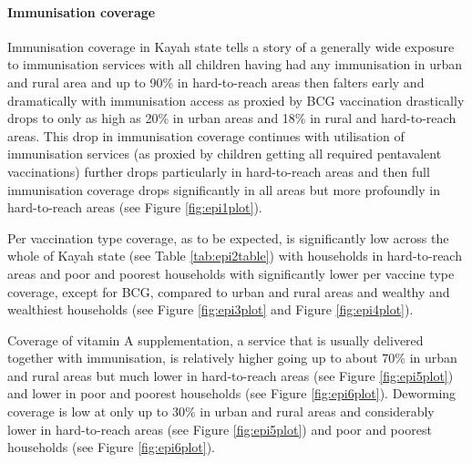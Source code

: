 \documentclass[12pt,a4paper]{article}
\let\oldparagraph\paragraph
\renewcommand{\paragraph}[1]{\oldparagraph{#1}\mbox{}}
\begin{document}
\hypertarget{epi-results}{%
\paragraph{Immunisation coverage}\label{epi-results}}

Immunisation coverage in Kayah state tells a story of a generally wide exposure to immunisation services with all children having had any immunisation in urban and rural area and up to 90\% in hard-to-reach areas then falters early and dramatically with immunisation access as proxied by BCG vaccination drastically drops to only as high as 20\% in urban areas and 18\% in rural and hard-to-reach areas. This drop in immunisation coverage continues with utilisation of immunisation services (as proxied by children getting all required pentavalent vaccinations) further drops particularly in hard-to-reach areas and then full immunisation coverage drops significantly in all areas but more profoundly in hard-to-reach areas (see Figure \ref{fig:epi1plot}).

Per vaccination type coverage, as to be expected, is significantly low across the whole of Kayah state (see Table \ref{tab:epi2table}) with households in hard-to-reach areas and poor and poorest households with significantly lower per vaccine type coverage, except for BCG, compared to urban and rural areas and wealthy and wealthiest households (see Figure \ref{fig:epi3plot} and Figure \ref{fig:epi4plot}).

Coverage of vitamin A supplementation, a service that is usually delivered together with immunisation, is relatively higher going up to about 70\% in urban and rural areas but much lower in hard-to-reach areas (see Figure \ref{fig:epi5plot}) and lower in poor and poorest households (see Figure \ref{fig:epi6plot}). Deworming coverage is low at only up to 30\% in urban and rural areas and considerably lower in hard-to-reach areas (see Figure \ref{fig:epi5plot}) and poor and poorest households (see Figure \ref{fig:epi6plot}).
\end{document}
